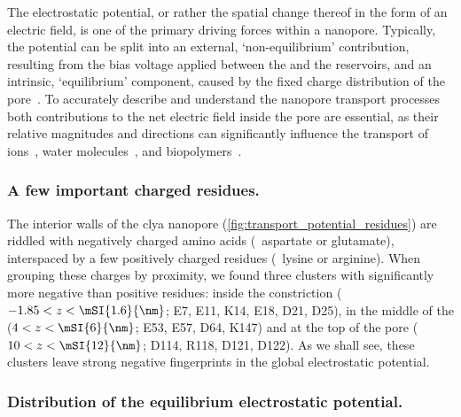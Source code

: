 The electrostatic potential, or rather the spatial change thereof in the form of an electric field, is one of
the primary driving forces within a nanopore. Typically, the potential can be split into an external,
`non-equilibrium' contribution, resulting from the bias voltage applied between the \transi{} and the \cisi{}
reservoirs, and an intrinsic, `equilibrium' component, caused by the fixed charge distribution of the
pore~\cite{Willems-Ruic-Biesemans-2019}. To accurately describe and understand the nanopore transport
processes both contributions to the net electric field inside the pore are essential, as their relative
magnitudes and directions can significantly influence the transport of
ions~\cite{Aksimentiev-2005,Bhattacharya-2011,DeBiase-2015,Basdevant-2019}, water
molecules~\cite{Laohakunakorn-2015,Bhadauria-2017}, and
biopolymers~\cite{Buchsbaum-2013,Muthukumar-2014,Willems-Ruic-Biesemans-2019}.


\subsubsection{A few important charged residues.}
%

The interior walls of the \gls{clya} nanopore (\cref{fig:transport_potential_residues}) are riddled with
negatively charged amino acids (\ie~aspartate or glutamate), interspaced by a few positively charged residues
(\ie~lysine or arginine). When grouping these charges by proximity, we found three clusters with significantly
more negative than positive residues: inside the \transi{} constriction ($-1.85 < z < \mSI{1.6}{\nm}$; E7,
E11, K14, E18, D21, D25), in the middle of the \cisi{} \lumen{} ($4 < z < \mSI{6}{\nm}$; E53, E57, D64, K147)
and at the top of the pore ($10 < z < \mSI{12}{\nm}$; D114, R118, D121, D122). As we shall see, these clusters
leave strong negative fingerprints in the global electrostatic potential.

\subsubsection{Distribution of the equilibrium electrostatic potential.}
%

